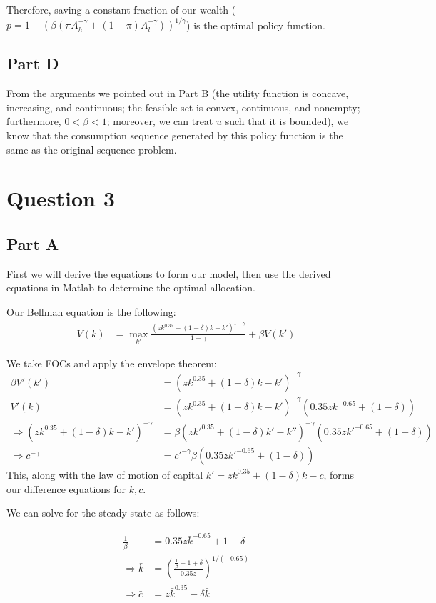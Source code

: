 \documentclass[11pt]{article} %
\begin{document}
Therefore, saving a constant fraction of our wealth ($p =  1 - (\beta (\pi A_h^{-\gamma} + (1-\pi) A_l^{-\gamma}))^{1/\gamma}$) is the optimal policy function.

\subsection{Part D}
From the arguments we pointed out in Part B (the utility function is concave, increasing, and continuous; the feasible set is convex, continuous, and nonempty; furthermore, $0<\beta<1$; moreover, we can treat $u$ such that it is bounded), we know that the consumption sequence generated by this policy function is the same as the original sequence problem.

\section{Question 3}
\subsection{Part A}
First we will derive the equations to form our model, then use the derived equations in Matlab to determine the optimal allocation.

Our Bellman equation is the following:
\begin{align*}
V(k) &= \max_{k'} \frac{(zk^{0.35} + (1-\delta)k - k')^{1-\gamma}}{1-\gamma} +\beta V(k')
\end{align*}

We take FOCs and apply the envelope theorem:
\begin{align*}
\beta V'(k') &=(zk^{0.35} + (1-\delta)k - k')^{-\gamma} \\
V'(k) &= (zk^{0.35} + (1-\delta)k - k')^{-\gamma}(0.35zk^{-0.65} +(1-\delta)) \\
\Rightarrow (zk^{0.35} + (1-\delta)k - k')^{-\gamma} &= \beta (zk'^{0.35} + (1-\delta)k' - k'')^{-\gamma}(0.35zk'^{-0.65} +(1-\delta))\\
\Rightarrow c^{-\gamma} &= c'^{-\gamma} \beta(0.35zk'^{-0.65}+(1-\delta))
\end{align*}
This, along with the law of motion of capital $k' = zk^{0.35} +(1-\delta)k - c$, forms our difference equations for $k,c$.

We can solve for the steady state as follows:

\begin{align*}
\frac{1}{\beta} &= 0.35z\bar{k}^{-0.65} +1 - \delta\\
\Rightarrow \bar{k} &= \left(\frac{\frac{1}{\beta}-1+\delta}{0.35z}\right)^{1/(-0.65)}\\
\Rightarrow \bar{c} &= z\bar{k}^{0.35} - \delta \bar{k}
\end{align*}
\end{document}
